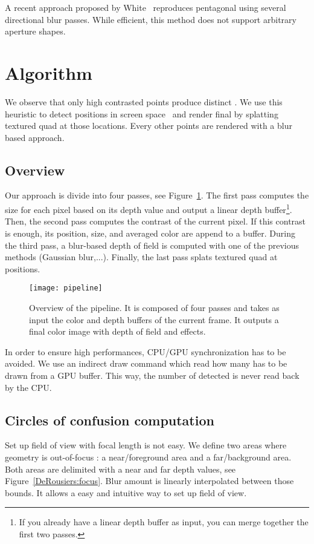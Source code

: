 A recent approach proposed by White~\cite{White11} reproduces pentagonal \bokeh using several directional blur passes. While efficient, this method does not support arbitrary aperture shapes.

\section{Algorithm}
We observe that only high contrasted points produce distinct \bokehs. We use this heuristic to detect \bokeh positions in screen space~\cite{Pettineo11} and render final \bokehs by splatting textured quad at those locations. Every other points are rendered with a blur based approach.

\subsection{Overview}
Our approach is divide into four passes, see Figure~\ref{DeRousiers:pipeline}. The first pass computes the \coc size for each pixel based on its depth value and output a linear depth buffer\footnote{If you already have a linear depth buffer as input, you can merge together the first two passes.}. Then, the second pass computes the contrast of the current pixel. If this contrast is enough, its position, \coc size, and averaged color are append to a buffer. During the third pass, a blur-based depth of field is computed with one of the previous methods (Gaussian blur,...). Finally, the last pass splats textured quad at \bokeh positions.

	\begin{figure}[htb]\centering
	\texttt{[image: pipeline]}
	\caption{Overview of the pipeline. It is composed of four passes and takes as input the color and depth buffers of the current frame. It outputs a final color image with depth of field and \bokeh effects.}
	\label{DeRousiers:pipeline}
	\end{figure}

In order to ensure high performances, CPU/GPU synchronization has to be avoided. We use an indirect draw command which read how many \bokeh has to be drawn from a GPU buffer. This way, the number of detected \bokehs is never read back by the CPU.

\subsection{Circles of confusion computation}
Set up field of view with focal length is not easy. We define two areas where geometry is out-of-focus : a near/foreground area and a far/background area. Both areas are delimited with a near and far depth values, see Figure~\ref{DeRousiers:focus}. Blur amount is linearly interpolated between those bounds. It allows a easy and intuitive way to set up field of view.


